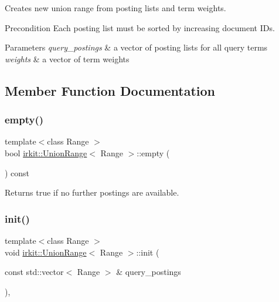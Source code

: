 Creates new union range from posting lists and term weights. 

\begin{DoxyPrecond}{Precondition}
Each posting list must be sorted by increasing document I\+Ds. 
\end{DoxyPrecond}

\begin{DoxyParams}{Parameters}
{\em query\+\_\+postings} & a vector of posting lists for all query terms \\
\hline
{\em weights} & a vector of term weights \\
\hline
\end{DoxyParams}


\subsection{Member Function Documentation}
\mbox{\label{classirkit_1_1UnionRange_af12b028d791c9d9821c17ae30084fa86}} 
\subsubsection{\texorpdfstring{empty()}{empty()}}
{\footnotesize\ttfamily template$<$class Range $>$ \\
bool \mbox{\hyperlink{classirkit_1_1UnionRange}{irkit\+::\+Union\+Range}}$<$ Range $>$\+::empty (\begin{DoxyParamCaption}{ }\end{DoxyParamCaption}) const\hspace{0.3cm}{\ttfamily [inline]}}



Returns true if no further postings are available. 

\mbox{\label{classirkit_1_1UnionRange_aabdf133213056f20e0526c6736dbff3e}} 
\subsubsection{\texorpdfstring{init()}{init()}}
{\footnotesize\ttfamily template$<$class Range $>$ \\
void \mbox{\hyperlink{classirkit_1_1UnionRange}{irkit\+::\+Union\+Range}}$<$ Range $>$\+::init (\begin{DoxyParamCaption}\item[{const std\+::vector$<$ Range $>$ \&}]{query\+\_\+postings }\end{DoxyParamCaption})\hspace{0.3cm}{\ttfamily [inline]}, {\ttfamily [protected]}}



